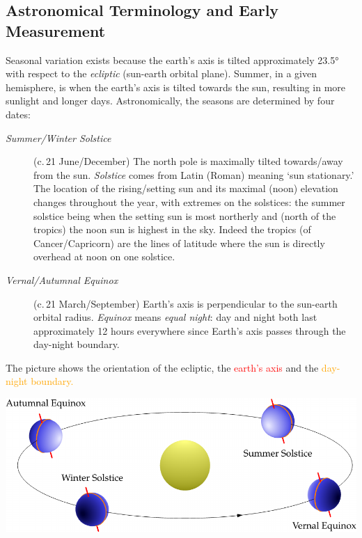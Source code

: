 \goodbreak



\subsection{Astronomical Terminology and Early Measurement}\label{ssec:astro1}

Seasonal variation exists because the earth's axis is tilted approximately \ang{23.5} with respect to the \emph{ecliptic} (sun-earth orbital plane). Summer, in a given hemisphere, is when the earth's axis is tilted towards the sun, resulting in more sunlight and longer days. Astronomically, the seasons are determined by four dates:
\begin{description}
	\item[\normalfont\emph{Summer/Winter Solstice}] (c.\,21\st{} June/December) The north pole is maximally tilted towards/away from the sun. \emph{Solstice} comes from Latin (Roman) meaning `sun stationary.' The location of the rising/setting sun and its maximal (noon) elevation changes throughout the year, with extremes on the solstices: the summer solstice being when the setting sun is most northerly and (north of the tropics) the noon sun is highest in the sky. Indeed the tropics (of Cancer/Capricorn) are the lines of latitude where the sun is directly overhead at noon on one solstice.
	\item[\normalfont\emph{Vernal/Autumnal Equinox}] (c.\,21\st{} March/September) Earth's axis is perpendicular to the sun-earth orbital radius. \emph{Equinox} means \emph{equal night}: day and night both last approximately 12 hours everywhere since Earth's axis passes through the day-night boundary.
\end{description}
The picture shows the orientation of the ecliptic, the \textcolor{red}{earth's axis} and the \textcolor{orange}{day-night boundary.}

\begin{center}
	\href{http://www.math.uci.edu/~ndonalds/math184/ecliptic.html}{\includegraphics[scale=0.95]{ecliptic}}
\end{center}

